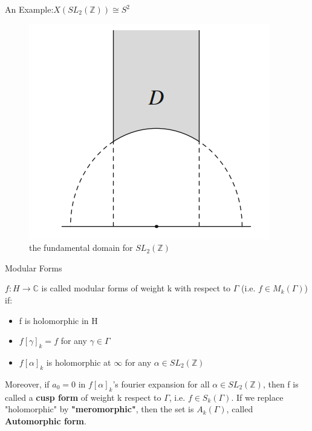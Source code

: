\documentclass{beamer}
\theoremstyle{plain}
\theoremstyle{definition}
\theoremstyle{remark}
\newcommand{\Z}{\mathbb{Z}}
\begin{document}
\begin{frame}{An Example:$X(SL_2(\Z)) \cong S^2$}
    \begin{figure}
        \centering
        \includegraphics[scale=0.30]{the fundamental domain for SL_2(Z).png}
        \caption{the fundamental domain for $SL_2(\Z)$}
    \end{figure}
\end{frame}

\begin{frame}{Modular Forms}

    \begin{definition}
        $f: H \to \mathbb{C} $ is called modular forms of weight k with respect to $\Gamma$
        (i.e. $f \in M_k(\Gamma)$) if:
        \begin{itemize}
            \item f is holomorphic in H
            \item $f[\gamma]_k=f$ for any $\gamma \in \Gamma$
            \item $f[\alpha]_k$ is holomorphic at $\infty$ for any $\alpha \in SL_2(\Z)$
        \end{itemize}
    \end{definition}
    \pause
    Moreover,
    if $a_0=0$ in $f[\alpha]_k$'s fourier expansion for all $\alpha \in SL_2(\Z)$,
    then f is called a \textbf{cusp form} of weight k respect to $\Gamma$, i.e. $f \in S_k(\Gamma)$.\pause
    \vskip 0.2cm
    If we replace "holomorphic" by \textbf{"meromorphic"}, then the set is $A_k(\Gamma)$, called \textbf{Automorphic form}.

\end{frame}
\end{document}

